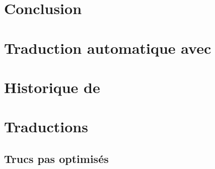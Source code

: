 \documentclass[a4paper,12pt,oneside]{extbook}
\begin{document}
%






\section{Conclusion}



\section{Traduction automatique avec \touist}\label{chap:touist}

\section{Historique de \touist}








\section{Traductions}
\subsection{Trucs pas optimisés}
\end{document}

